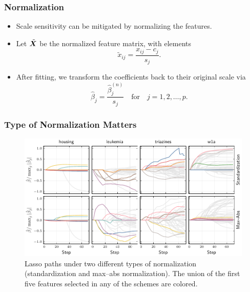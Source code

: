 \documentclass[10pt]{beamer}
\begin{document}
\begin{frame}[c]
  \frametitle{Normalization}

  \begin{itemize}[<+->]
    \item Scale sensitivity can be mitigated by normalizing the features.
    \item Let \(\tilde{\bm{X}}\) be the normalized feature matrix, with elements
          \[
            \tilde{x}_{ij} = \frac{x_{ij} - c_{j}}{s_j}.
          \]
    \item After fitting, we transform the coefficients back to their original scale via
          \[
            \hat\beta_j = \frac{\hat\beta^{(n)}_j}{s_j} \quad\text{for}\quad j = 1,2,\dots,p.
          \]
  \end{itemize}
\end{frame}

\begin{frame}[c]
  \frametitle{Type of Normalization Matters}

  \begin{figure}[htpb]
    \centering
    \includegraphics[width=\textwidth]{images/paper6-realdata_paths.pdf}
    \caption{%
      Lasso paths under two different types of normalization (standardization and max--abs normalization). The union of the first five features selected in any of the schemes are colored.
    }
  \end{figure}

\end{frame}
\end{document}
